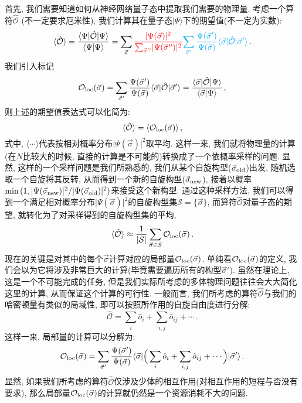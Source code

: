 \documentclass[10pt]{article}
\newcommand{\qket}{\rangle}
\newcommand{\qbar}{\langle}
\begin{document}
首先, 我们需要知道如何从神经网络量子态中提取我们需要的物理量. 
考虑一个算符$\mathcal{\hat{O}}$ (不一定要求厄米性), 我们计算其在量子态$\lvert\Psi\qket$下的期望值(不一定为实数):
\[ \qbar\mathcal{\hat{O}}\qket = \frac{\qbar\Psi\vert\hat{\mathcal{O}}\vert\Psi\qket}{\qbar\Psi\vert\Psi\qket} = \sum_{\vec{\sigma}} {\color{red}{\frac{\lvert\Psi(\vec{\sigma})\rvert^2}{\sum_{\vec{\sigma}''}\lvert\Psi(\vec{\sigma}'')\rvert^{2}}}} {\color{cyan}{\sum_{\vec{\sigma}'}\frac{\Psi(\vec{\sigma}')}{\Psi(\vec{\sigma})} \qbar\vec{\sigma}\vert\hat{\mathcal{O}}\vert\vec{\sigma}'\qket}}\,. \]
我们引入标记
\[ \mathcal{O}_{\rm loc}(\vec{\sigma}) = \sum_{\vec{\sigma}'}\frac{\Psi(\vec{\sigma}')}{\Psi(\vec{\sigma})} \qbar\vec{\sigma}\vert\hat{\mathcal{O}}\vert\vec{\sigma}'\qket = \frac{\qbar\vec{\sigma}\rvert\hat{\mathcal{O}}\lvert\Psi\qket}{\qbar\vec{\sigma}\vert\Psi\qket}\,, \]
则上述的期望值表达式可以化简为:
\[ \qbar\hat{\mathcal{O}}\qket = \qbar\mathcal{O}_{\rm loc}(\vec{\sigma})\qket\,, \]
式中, $\qbar\cdots\qket$代表按相对概率分布$\lvert\Psi(\vec{\sigma})\rvert^2$取平均. 
这样一来, 我们就将物理量的计算(在$N$比较大的时候, 直接的计算是不可能的)转换成了一个依概率采样的问题. 
显然, 这样的一个采样问题是我们所熟悉的, 我们从某个自旋构型($\vec{\sigma}_{\rm old}$)出发, 随机选取一个自旋将其反转, 从而得到一个新的自旋构型($\vec{\sigma}_{\rm new}$), 接着以概率$\min{(1, \lvert\Psi(\vec{\sigma}_{\rm new})\rvert^{2}/\lvert\Psi(\vec{\sigma}_{\rm old})\rvert^{2})}$来接受这个新构型. 
通过这种采样方法, 我们可以得到一个满足相对概率分布$\lvert\Psi(\vec{\sigma})\rvert^2$的自旋构型集$\mathcal{S}=\{\vec{\sigma}\}$, 而算符$\hat{\mathcal{O}}$对量子态的期望, 就转化为了对采样得到的自旋构型集的平均, 
\[ \qbar\hat{\mathcal{O}}\qket \approx \frac{1}{\lvert\mathcal{S}\rvert} \sum_{\vec{\sigma}\in\mathcal{S}} \mathcal{O}_{\rm loc}(\vec{\sigma})\,. \]
现在的关键是对其中的每个$\vec{\sigma}$计算对应的局部量$\mathcal{O}_{\rm loc}(\vec{\sigma})$. 
单纯看$\mathcal{O}_{\rm loc}(\vec{\sigma})$的定义, 我们会以为它将涉及非常巨大的计算(毕竟需要遍历所有的构型$\vec{\sigma}'$). 
虽然在理论上, 这是一个不可能完成的任务, 但是我们实际所考虑的多体物理问题往往会大大简化这里的计算, 从而保证这个计算的可行性. 
一般而言, 我们所考虑的算符$\hat{\mathcal{O}}$与我们的哈密顿量有类似的局域性, 即可以按照所作用的自旋自由度进行分解:
\[ \hat{\mathcal{O}} = \sum_{i} \hat{o}_{i} + \sum_{i,j} \hat{o}_{ij} + \cdots\,. \]
这样一来, 局部量的计算可以分解为:
\[ \mathcal{O}_{\rm loc}(\vec{\sigma}) = \sum_{\vec{\sigma}'}\frac{\Psi(\vec{\sigma}')}{\Psi(\vec{\sigma})} \qbar\vec{\sigma}\vert\Big(\sum_{i} \hat{o}_{i} + \sum_{i,j} \hat{o}_{ij} + \cdots\Big)\vert\vec{\sigma}'\qket\,. \]
显然, 如果我们所考虑的算符$\hat{\mathcal{O}}$仅涉及少体的相互作用(对相互作用的短程与否没有要求), 那么局部量$\mathcal{O}_{\rm loc}(\vec{\sigma})$的计算就仍然是一个资源消耗不大的问题. 
\end{document}
